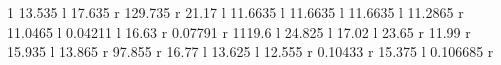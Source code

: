 \documentclass[letterpaper,10pt]{article}
\begin{document}
                                        1 13.535 l  17.635 r  129.735 r  21.17 l  11.6635 l  11.6635 l  11.6635 l  11.2865 r  11.0465 l  0.04211 l  16.63 r  0.07791 r  1119.6 l  24.825 l  17.02 l  23.65 r  11.99 r  15.935 l  13.865 r  97.855 r  16.77 l  13.625 l  12.555 r  0.10433 r  15.375 l  0.106685 r \newline
\end{document}
